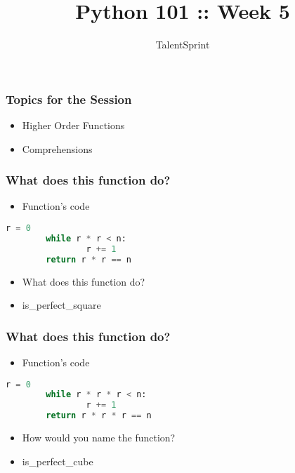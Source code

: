 \documentclass[14pt]{beamer}
\title{Python 101 :: Week 5}
\date{}
\author[TS]{TalentSprint}
\begin{document}
    \begin{frame}
        \titlepage
    \end{frame}
    \begin{frame}
        \frametitle{Topics for the Session}
        \begin{itemize}
            \item Higher Order Functions
            \item Comprehensions
        \end{itemize}
    \end{frame}

    \begin{frame}[containsverbatim]
        \frametitle{What does this function do?}
        \begin{itemize}
        \item Function's code
        \end{itemize}
        \begin{lstlisting}[language=Python]
        r = 0
        while r * r < n:
                r += 1
        return r * r == n
        \end{lstlisting}
        \begin{itemize}
        \item \alert {What does this function do?}
        \item is\_perfect\_square
        \end{itemize}
    \end{frame}
 
    \begin{frame}[containsverbatim]
        \frametitle{What does this function do?}
        \begin{itemize}
        \item Function's code
        \end{itemize}
        \begin{lstlisting}[language=Python]
        r = 0
        while r * r * r < n:
                r += 1
        return r * r * r == n
        \end{lstlisting}
        \begin{itemize}
        \item \alert {How would you name the function?}
        \item is\_perfect\_cube
        \end{itemize}
    \end{frame}
\end{document}
